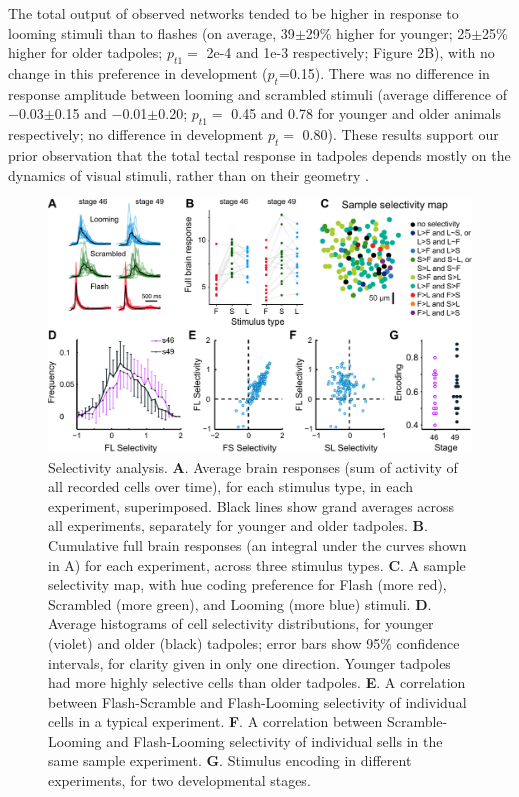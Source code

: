 \documentclass{article}
\begin{document}
The total output of observed networks tended to be higher in response to looming stimuli than to flashes (on average, 39$\pm$29\% higher for younger; 25$\pm$25\% higher for older tadpoles; $p_{t1}=$ 2e-4 and 1e-3 respectively; Figure 2B), with no change in this preference in development ($p_t$=0.15). There was no difference in response amplitude between looming and scrambled stimuli (average difference of $-$0.03$\pm$0.15 and $-$0.01$\pm$0.20; $p_{t1}=$ 0.45 and 0.78 for younger and older animals respectively; no difference in development $p_t=$ 0.80). These results support our prior observation that the total tectal response in tadpoles depends mostly on the dynamics of visual stimuli, rather than on their geometry \citep{khakhalin2014, jang2016}.

\begin{figure}[t!]
\includegraphics[width=\linewidth]{fig2.pdf}
\caption{
Selectivity analysis. \textbf{A}. Average brain responses (sum of activity of all recorded cells over time), for each stimulus type, in each experiment, superimposed. Black lines show grand averages across all experiments, separately for younger and older tadpoles. \textbf{B}. Cumulative full brain responses (an integral under the curves shown in A) for each experiment, across three stimulus types. \textbf{C}. A sample selectivity map, with hue coding preference for Flash (more red), Scrambled (more green), and Looming (more blue) stimuli. \textbf{D}. Average histograms of cell selectivity distributions, for younger (violet) and older (black) tadpoles; error bars show 95\% confidence intervals, for clarity given in only one direction. Younger tadpoles had more highly selective cells than older tadpoles. \textbf{E}. A correlation between Flash-Scramble and Flash-Looming selectivity of individual cells in a typical experiment. \textbf{F}. A correlation between Scramble-Looming and Flash-Looming selectivity of individual sells in the same sample experiment. \textbf{G}. Stimulus encoding in different experiments, for two developmental stages.}
\end{figure}
\end{document}
